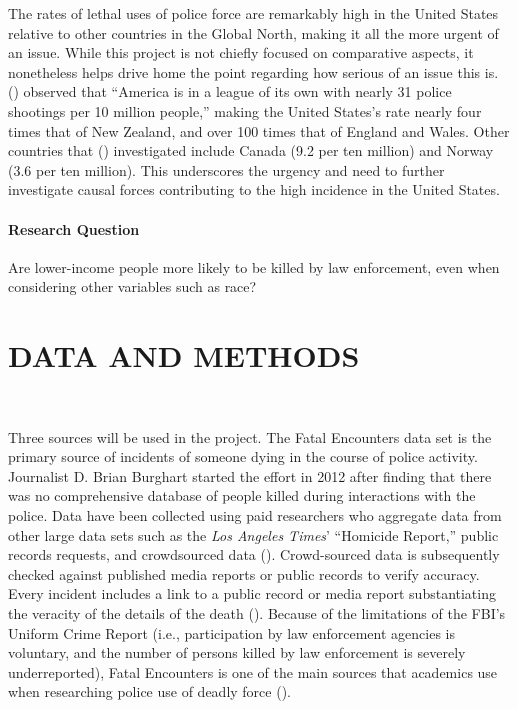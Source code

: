 \documentclass[12pt]{article}
\begin{document}
The rates of lethal uses of police force are remarkably high in the United States relative to other countries in the Global North, making it all the more urgent of an issue. While this project is not chiefly focused on comparative aspects, it nonetheless helps drive home the point regarding how serious of an issue this is. \citeauthor{espinerLicenceKillStartling2022} (\citeyear{espinerLicenceKillStartling2022}) observed that “America is in a league of its own with nearly 31 police shootings per 10 million people,” making the United States’s rate nearly four times that of New Zealand, and over 100 times that of England and Wales. Other countries that \citeauthor{espinerLicenceKillStartling2022} (\citeyear{espinerLicenceKillStartling2022}) investigated include Canada (9.2 per ten million) and Norway (3.6 per ten million). This underscores the urgency and need to further investigate causal forces contributing to the high incidence in the United States.

\subsection{Research Question}

Are lower-income people more likely to be killed by law enforcement, even when considering other variables such as race?

\part{DATA AND METHODS}\

Three sources will be used in the project. The Fatal Encounters data set is the primary source of incidents of someone dying in the course of police activity. Journalist D. Brian Burghart started the effort in 2012 after finding that there was no comprehensive database of people killed during interactions with the police. Data have been collected using paid researchers who aggregate data from other large data sets such as the \textit{Los Angeles Times}’ “Homicide Report,” public records requests, and crowdsourced data (\cite{burghartMeFatalEncounters}). Crowd-sourced data is subsequently checked against published media reports or public records to verify accuracy. Every incident includes a link to a public record or media report substantiating the veracity of the details of the death (\cite{burghartMeFatalEncounters}). Because of the limitations of the FBI’s Uniform Crime Report (i.e., participation by law enforcement agencies is voluntary, and the number of persons killed by law enforcement is severely underreported), Fatal Encounters is one of the main sources that academics use when researching police use of deadly force (\cite{feldmanKilledPoliceValidity2017, feldmanQuantifyingUnderreportingLawenforcementrelated2017, feldmanPoliceRelatedDeathsNeighborhood2019}).
\end{document}
